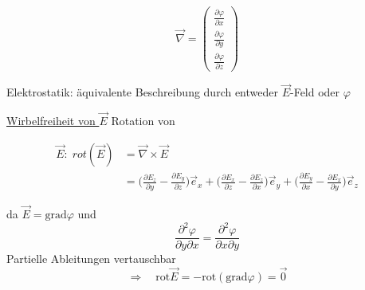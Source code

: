 \documentclass[titlepage,12pt,a4paper,ngerman]{report}
\begin{document}
\begin{itemize}
\begin{itemize}
\begin{itemize}
$$\vec{\nabla} = \begin{pmatrix}
\frac{\partial \varphi}{\partial x} \\
\frac{\partial \varphi}{\partial y} \\
\frac{\partial \varphi}{\partial z} 
\end{pmatrix}$$

\end{itemize} 
\end{itemize}

Elektrostatik: äquivalente Beschreibung durch entweder $\vec{E}$-Feld oder $\varphi$\\
\end{itemize}
\underline{Wirbelfreiheit von $\vec{E}$}
Rotation von 

\begin{align*}
\vec{E}:\; rot(\vec{E}) &= \vec{\nabla} \times \vec{E} \\
&= \bigg( \frac{\partial E_z}{\partial y} - \frac{\partial E_y}{\partial z} \bigg) \vec{e}_x + \bigg( \frac{\partial E_x}{\partial z} - \frac{\partial E_z}{\partial x} \bigg) \vec{e}_y + \bigg( \frac{\partial E_y}{\partial x} - \frac{\partial E_x}{\partial y} \bigg) \vec{e}_z
\end{align*}

da $\vec{E} = \textrm{grad} \varphi $ und 
$$ \frac{\partial^2 \varphi}{\partial y \partial x} = \frac{\partial^2 \varphi}{\partial x \partial y}$$
Partielle Ableitungen vertauschbar
$$ \Rightarrow \quad \textrm{rot} \vec{E} = - \textrm{rot}(\textrm{grad} \varphi ) = \vec{0}$$
\end{document}
